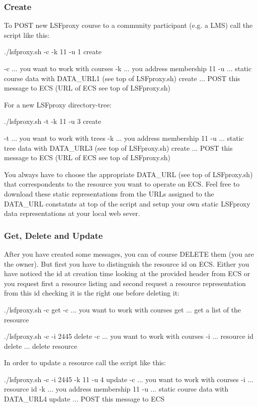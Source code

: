 \subsubsection{Create}
To POST new LSFproxy course to a community participant (e.g. a LMS) call the
script like this:
\begin{code}
  ./lsfproxy.sh -c -k 11 -u 1 create

  -c ... you want to work with courses
  -k ... you address membership 11
  -u ... static course data with DATA_URL1 (see top of LSFproxy.sh)
  create ... POST this message to ECS (URL of ECS see top of LSFproxy.sh)
\end{code}
For a new LSFproxy directory-tree:
\begin{code}
  ./lsfproxy.sh -t -k 11 -u 3 create

  -t ... you want to work with trees
  -k ... you address membership 11
  -u ... static tree data with DATA_URL3 (see top of LSFproxy.sh)
  create ... POST this message to ECS (URL of ECS see top of LSFproxy.sh)
\end{code}

You always have to choose the appropriate DATA\_URL (see top of LSFproxy.sh)
that correspondents to the resource you want to operate on ECS. Feel free to
download these static representations from the URLs assigned to the DATA\_URL
constatnts at top of the script and setup your own static LSFproxy data
representations at your local web sever.

\subsubsection{Get, Delete and Update}
After you have created some messages, you can of course DELETE them (you are
the owner). But first you have to distinguish the resource id on ECS. Either
you have noticed the id at creation time looking at the provided 
header from ECS or you request first a resource listing and second request a
resource representation from this id checking it is the right one before
deleting it:
\begin{code}
  ./lsfproxy.sh -c get
  -c ... you want to work with courses
  get ... get a list of the resource

  ./lsfproxy.sh -c -i 2445 delete
  -c ... you want to work with courses
  -i ... resource id
  delete ... delete resource
\end{code}
In order to update a resource call the script like this:
\begin{code}
  ./lsfproxy.sh -c -i 2445 -k 11 -u 4 update
  -c ... you want to work with courses
  -i ... resource id
  -k ... you address membership 11
  -u ... static course data with DATA_URL4
  update ... POST this message to ECS
\end{code}

